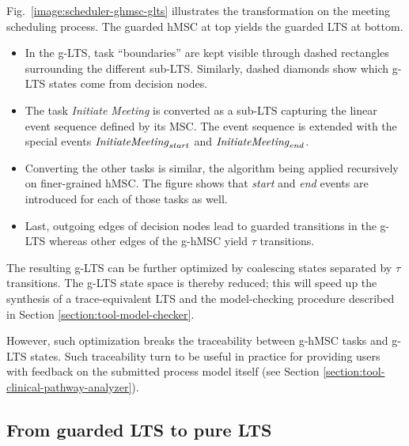 Fig.~\ref{image:scheduler-ghmsc-glts} illustrates the transformation on the meeting scheduling process. The guarded hMSC at top yields the guarded LTS at bottom.
\begin{itemize}
\item In the g-LTS, task ``boundaries'' are kept visible through dashed rectangles surrounding the different sub-LTS.  Similarly, dashed diamonds show which g-LTS states come from decision nodes. 
\item The task \emph{Initiate Meeting} is converted as a sub-LTS capturing the linear event sequence defined by its MSC. The event sequence is extended with the special events $\mbox{\emph{InitiateMeeting}}_{start}$ and $\mbox{\emph{InitiateMeeting}}_{end}$.
\item Converting the other tasks is similar, the algorithm being applied recursively on finer-grained hMSC. The figure shows that \emph{start} and \emph{end} events are introduced for each of those tasks as well. 
\item Last, outgoing edges of decision nodes lead to guarded transitions in the g-LTS whereas other edges of the g-hMSC yield $\tau$ transitions.
\end{itemize}

The resulting g-LTS can be further optimized by coalescing states separated by $\tau$ transitions. The g-LTS state space is thereby reduced; this will speed up the synthesis of a trace-equivalent LTS and the model-checking procedure described in Section \ref{section:tool-model-checker}. 

However, such optimization breaks the traceability between g-hMSC tasks and g-LTS states. Such traceability turn to be useful in practice for providing users with feedback on the submitted process model itself (see Section \ref{section:tool-clinical-pathway-analyzer}). 

\subsection{From guarded LTS to pure LTS\label{subsection:from-glts-to-lts}}

